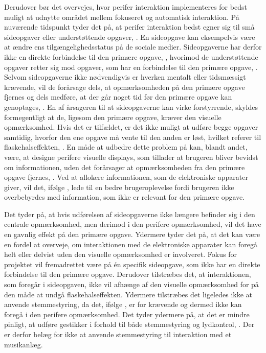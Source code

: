Derudover bør det overvejes, hvor perifer interaktion implementeres for bedst muligt at udnytte området mellem fokuseret og automatisk interaktion. På nuværende tidspunkt tyder det på, at perifer interaktion bedst egner sig til små sideopgaver eller understøttende opgaver, \parencite[s. 21]{PDF:EvaluatingPI}. En sideopgave kan eksempelvis være at ændre ens tilgængelighedsstatus på de sociale medier. Sideopgaverne har derfor ikke en direkte forbindelse til den primære opgave, \parencite[s. 162]{PDF:ComparingInputModalities}, hvorimod de understøttende opgaver retter sig mod opgaver, som har en forbindelse til den primære opgave, \parencite[s. 21]{PDF:EvaluatingPI}. Selvom sideopgaverne ikke nødvendigvis er hverken mentalt eller tidsmæssigt krævende, vil de forårsage dels, at opmærksomheden på den primære opgave fjernes og dels medføre, at der går noget tid før den primære opgave kan genoptages, \parencite[s. 162]{PDF:ComparingInputModalities}. En af årsageren til at sideopgaverne kan virke forstyrrende, skyldes formegentligt at de, ligesom den primære opgave, kræver den visuelle opmærksomhed. Hvis det er tilfældet, er det ikke muligt at udføre begge opgaver samtidig, hvorfor den ene opgave må vente til den anden er løst, hvilket referer til flaskehalseffekten, \parencite[s. 240]{PDF:PICharacteristicsAndConsiderations}. En måde at udbedre dette problem på kan, blandt andet, være, at designe perifere visuelle displays, som tillader at brugeren bliver bevidst om informationen, uden det forårsager at opmærksomheden fra den primære opgave fjernes, \parencite[s. 247]{PDF:AToolkitForManaging}. Ved at allokere informationen, som de elektroniske apparater giver, vil det, ifølge \textcite[s. 55]{PDF:PITheoriesKap3}, lede til en bedre brugeroplevelse fordi brugeren ikke overbebyrdes med information, som ikke er relevant for den primære opgave. 

Det tyder på, at hvis udførelsen af sideopgaverne ikke længere befinder sig i den centrale opmærksomhed, men derimod i den perifere opmærksomhed, vil det have en gavnlig effekt på den primære opgave. Ydermere tyder det på, at det kan være en fordel at overveje, om interaktionen med de elektroniske apparater kan foregå helt eller delvist uden den visuelle opmærksomhed er involveret. Fokus for projektet vil fremadrettet være på én specifik sideopgave, som ikke har en direkte forbindelse til den primære opgave. Derudover tilstræbes det, at interaktionen, som foregår i sideopgaven, ikke vil afhænge af den visuelle opmærksomhed for på den måde at undgå flaskehalseffekten. Ydermere tilstræbes det ligeledes ikke at anvende stemmestyring, da det, ifølge \textcite[s. 41]{PDF:PIEmbeddingHCIMicroManageMe}, er for krævende og dermed ikke kan foregå i den perifere opmærksomhed. Det tyder ydermere på, at det er mindre pinligt, at udføre gestikker i forhold til både stemmestyring og lydkontrol, \parencite[s. 4]{PDF:AnExploratoryStudy}. Der er derfor belæg for ikke at anvende stemmestyring til interaktion med et musikanlæg.

